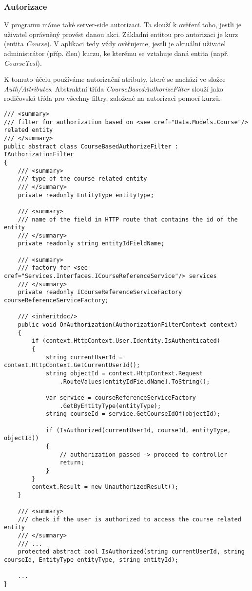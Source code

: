 \subsubsection*{Autorizace}

V programu máme také server-side autorizaci. Ta slouží k ověření toho, jestli je uživatel oprávněný provést danou akci. Základní entitou pro autorizaci je kurz (entita \textit{Course}). V aplikaci tedy vždy ověřujeme, jestli je aktuální uživatel administrátor (příp. člen) kurzu, ke kterému se vztahuje daná entita (např. \textit{CourseTest}).

K tomuto účelu používáme autorizační atributy, které se nachází ve složce \textit{Auth/Attributes}. 
Abstraktní třída \textit{CourseBasedAuthorizeFilter} slouží jako rodičovská třída pro všechny filtry, založené na autorizaci pomocí kurzů.

\begin{lstlisting}
/// <summary>
/// filter for authorization based on <see cref="Data.Models.Course"/> related entity
/// </summary>
public abstract class CourseBasedAuthorizeFilter : IAuthorizationFilter
{
	/// <summary>
	/// type of the course related entity
	/// </summary>
	private readonly EntityType entityType;
	
	/// <summary>
	/// name of the field in HTTP route that contains the id of the entity
	/// </summary>
	private readonly string entityIdFieldName;
	
	/// <summary>
	/// factory for <see cref="Services.Interfaces.ICourseReferenceService"/> services
	/// </summary>
	private readonly ICourseReferenceServiceFactory courseReferenceServiceFactory;

	/// <inheritdoc/>
	public void OnAuthorization(AuthorizationFilterContext context)
	{
		if (context.HttpContext.User.Identity.IsAuthenticated)
		{
			string currentUserId = context.HttpContext.GetCurrentUserId();
			string objectId = context.HttpContext.Request
				.RouteValues[entityIdFieldName].ToString();
			
			var service = courseReferenceServiceFactory
				.GetByEntityType(entityType);
			string courseId = service.GetCourseIdOf(objectId);
			
			if (IsAuthorized(currentUserId, courseId, entityType, objectId))
			{
				// authorization passed -> proceed to controller
				return;
			}			
		}
		context.Result = new UnauthorizedResult();
	}
	
	/// <summary>
	/// check if the user is authorized to access the course related entity
	/// </summary>
	/// ...
	protected abstract bool IsAuthorized(string currentUserId, string courseId, EntityType entityType, string entityId);
	
	...
}
\end{lstlisting}

